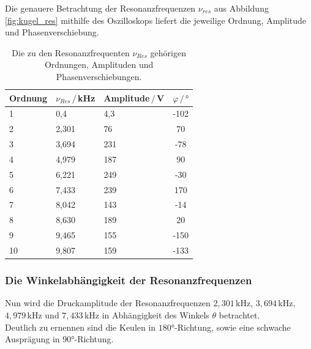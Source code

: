 Die genauere Betrachtung der Resonanzfrequenzen $\nu_{res}$ aus Abbildung \ref{fig:kugel_res} mithilfe des Oszilloskops
liefert die jeweilige Ordnung, Amplitude und Phasenverschiebung.

\begin{table}[H]
    \center
    \caption{Die zu den Resonanzfrequenten $\nu_{Res}$ gehörigen Ordnungen, Amplituden und Phasenverschiebungen.}
    \begin{tabular}{l l l c}
        \toprule
        Ordnung & $\nu_{Res}\,/\,$kHz & Amplitude$\,/\,$V & $\varphi\,/\,°$\\
        \midrule
        1 &0,4 &4,3 &-102 \\
        2 &2,301 &76 &70 \\
        3 &3,694 &231 &-78 \\
        4 &4,979 &187 &90 \\
        5 &6,221 &249 &-30 \\
        6 &7,433 &239 &170 \\
        7 &8,042 &143 &-14 \\
        8 &8,630 &189 &20 \\
        9 &9,465 &155 &-150 \\
        10 &9,807 &159 &-133 \\
        \bottomrule
    \end{tabular}
\end{table}

\subsubsection{Die Winkelabhängigkeit der Resonanzfrequenzen}
Nun wird die Druckamplitude der Resonanzfrequenzen $2,301\,$kHz, $3,694\,$kHz, $4,979\,$kHz und $7,433\,$kHz 
in Abhängigkeit des Winkels $\theta$ betrachtet.\\
Deutlich zu ernennen sind die Keulen in $180°$-Richtung, sowie eine schwache Ausprägung in $90°$-Richtung.

\begin{figure}[H]
    \centering
    \hfil
    \hfil 
    
    \hfil
    \hfil 
    \caption{}\label{figure}
\end{figure}
